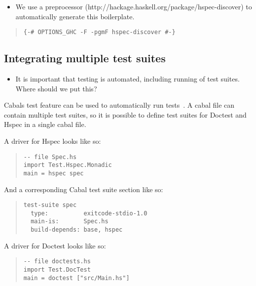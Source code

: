 \documentclass[preprint]{sigplanconf}
\begin{document}
\begin{itemize}
\item We use a preprocessor (http://hackage.haskell.org/package/hspec-discover) to automatically generate this boilerplate.
\end{itemize}

\begin{quote}
\small
\begin{verbatim}
{-# OPTIONS_GHC -F -pgmF hspec-discover #-}
\end{verbatim}
\end{quote}

\subsection{Integrating multiple test suites}

\begin{itemize}

\item It is important that testing is automated, including running of test
    suites.  Where should we put this?
\end{itemize}

\noindent Cabals test feature can be used to automatically run tests~\cite{cabal}.  A cabal
file can contain multiple test suites, so it is possible to define test suites
for Doctest and Hspec in a single cabal file.

A driver for Hspec looks like so:

\begin{quote}
\small
\begin{verbatim}
-- file Spec.hs
import Test.Hspec.Monadic
main = hspec spec
\end{verbatim}
\end{quote}

\noindent And a corresponding Cabal test suite section like so:

\begin{quote}
\small
\begin{verbatim}
test-suite spec
  type:          exitcode-stdio-1.0
  main-is:       Spec.hs
  build-depends: base, hspec
\end{verbatim}
\end{quote}

\noindent A driver for Doctest looks like so:

\begin{quote}
\small
\begin{verbatim}
-- file doctests.hs
import Test.DocTest
main = doctest ["src/Main.hs"]
\end{verbatim}
\end{quote}
\end{document}
